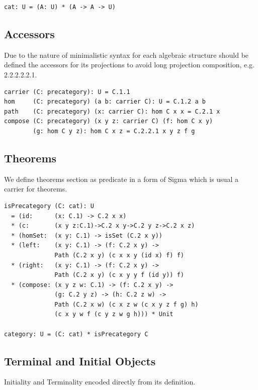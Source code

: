 \documentclass{article}
\begin{document}
\begin{lstlisting}[mathescape=true]
cat: U = (A: U) * (A -> A -> U)
\end{lstlisting}

\subsection{Accessors}

Due to the nature of minimalistic syntax for each algebraic structure
should be defined the accessors for its projections to avoid long projection
composition, e.g. 2.2.2.2.2.1.

\begin{lstlisting}[mathescape=true]
carrier (C: precategory): U = C.1.1
hom     (C: precategory) (a b: carrier C): U = C.1.2 a b
path    (C: precategory) (x: carrier C): hom C x x = C.2.1 x
compose (C: precategory) (x y z: carrier C) (f: hom C x y)
        (g: hom C y z): hom C x z = C.2.2.1 x y z f g
\end{lstlisting}

\subsection{Theorems}

We define theorems section as predicate in a form of Sigma
which is usual a carrier for theorems.

\begin{lstlisting}[mathescape=true]
isPrecategory (C: cat): U
  = (id:      (x: C.1) -> C.2 x x)
  * (c:       (x y z:C.1)->C.2 x y->C.2 y z->C.2 x z)
  * (homSet:  (x y: C.1) -> isSet (C.2 x y))
  * (left:    (x y: C.1) -> (f: C.2 x y) ->
              Path (C.2 x y) (c x x y (id x) f) f)
  * (right:   (x y: C.1) -> (f: C.2 x y) ->
              Path (C.2 x y) (c x y y f (id y)) f)
  * (compose: (x y z w: C.1) -> (f: C.2 x y) ->
              (g: C.2 y z) -> (h: C.2 z w) ->
              Path (C.2 x w) (c x z w (c x y z f g) h)
              (c x y w f (c y z w g h))) * Unit

category: U = (C: cat) * isPrecategory C
\end{lstlisting}

\subsection{Terminal and Initial Objects}

Initiality and Terminality encoded directly from its definition.
\end{document}
